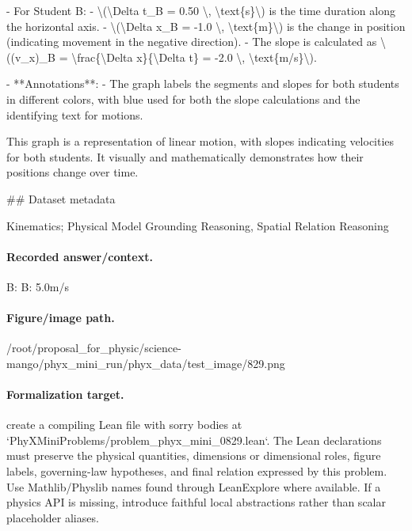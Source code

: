   - For Student B:
    - \textbackslash{}(\textbackslash{}Delta t\_B = 0.50 \textbackslash{}, \textbackslash{}text\{s\}\textbackslash{}) is the time duration along the horizontal axis.
    - \textbackslash{}(\textbackslash{}Delta x\_B = -1.0 \textbackslash{}, \textbackslash{}text\{m\}\textbackslash{}) is the change in position (indicating movement in the negative direction).
    - The slope is calculated as \textbackslash{}((v\_x)\_B = \textbackslash{}frac\{\textbackslash{}Delta x\}\{\textbackslash{}Delta t\} = -2.0 \textbackslash{}, \textbackslash{}text\{m/s\}\textbackslash{}).

- **Annotations**:
  - The graph labels the segments and slopes for both students in different colors, with blue used for both the slope calculations and the identifying text for motions.

This graph is a representation of linear motion, with slopes indicating velocities for both students. It visually and mathematically demonstrates how their positions change over time.

\#\# Dataset metadata

Kinematics; Physical Model Grounding Reasoning, Spatial Relation Reasoning

\paragraph{Recorded answer/context.}
B: B: 5.0m/s

\paragraph{Figure/image path.}
/root/proposal\_for\_physic/science-mango/phyx\_mini\_run/phyx\_data/test\_image/829.png

\paragraph{Formalization target.}
create a compiling Lean file with sorry bodies at `PhyXMiniProblems/problem\_phyx\_mini\_0829.lean`. The Lean declarations must preserve the physical quantities, dimensions or dimensional roles, figure labels, governing-law hypotheses, and final relation expressed by this problem.
Use Mathlib/Physlib names found through LeanExplore where available. If a physics API is missing, introduce faithful local abstractions rather than scalar placeholder aliases.

